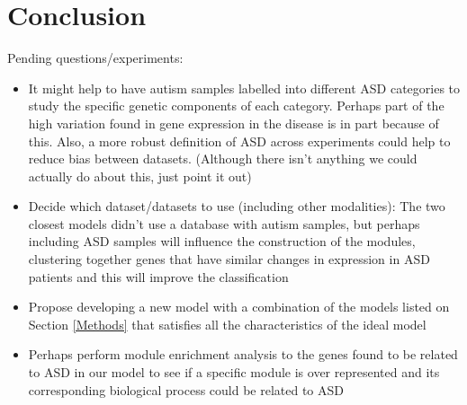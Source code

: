 \section{Conclusion}\label{Conclusion}

Pending questions/experiments:

\begin{itemize}
    \item It might help to have autism samples labelled into different ASD categories to study the specific genetic components of each category. Perhaps part of the high variation found in gene expression in the disease is in part because of this. Also, a more robust definition of ASD across experiments could help to reduce bias between datasets. (Although there isn't anything we could actually do about this, just point it out)

\item Decide which dataset/datasets to use (including other modalities): The two closest models didn't use a database with autism samples, but perhaps including ASD samples will influence the construction of the modules, clustering together genes that have similar changes in expression in ASD patients and this will improve the classification

\item Propose developing a new model with a combination of the models listed on Section \ref{Methods} that satisfies all the characteristics of the ideal model

\item Perhaps perform module enrichment analysis to the genes found to be related to ASD in our model to see if a specific module is over represented and its corresponding biological process could be related to ASD
\end{itemize}